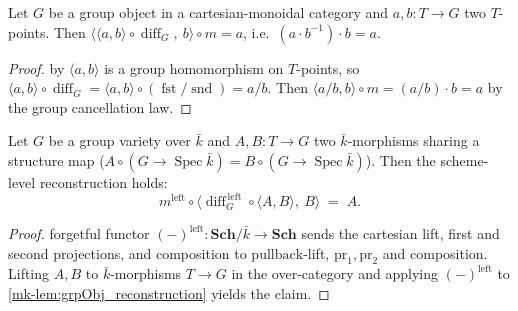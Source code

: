 \begin{lemma}\label{mk-lem:grpObj_reconstruction}
  \leanok

  Let \(G\) be a group object in a cartesian-monoidal category and \(a, b \colon T \to G\)
  two \(T\)-points. Then
  \(\bigl\langle \langle a, b\rangle \circ \operatorname{diff}_G,\ b \bigr\rangle \circ m
  = a\), i.e.\ \((a \cdot b^{-1}) \cdot b = a\).
\end{lemma}
\begin{proof}
  \leanokPrecomposition by \(\langle a, b\rangle\) is a group homomorphism on \(T\)-points, so
  \(\langle a, b\rangle \circ \operatorname{diff}_G = \langle a, b\rangle \circ
  (\operatorname{fst} / \operatorname{snd}) = a / b\). Then \(\langle a/b, b\rangle \circ m
  = (a/b) \cdot b = a\) by the group cancellation law.
\end{proof}

\begin{lemma}\label{mk-lem:scheme_reconstruction}
  \leanok

  Let \(G\) be a group variety over \(\bar k\) and \(A, B \colon T \to G\) two
  \(\bar k\)-morphisms sharing a structure map (\(A \circ (G \to \operatorname{Spec}\bar k)
  = B \circ (G \to \operatorname{Spec}\bar k)\)). Then the scheme-level reconstruction holds:
  \[
    m^{\mathrm{left}} \circ \bigl\langle
      \operatorname{diff}_G^{\,\mathrm{left}} \circ \langle A, B\rangle,\ B
    \bigr\rangle \;=\; A .
  \]
\end{lemma}
\begin{proof}
  \leanokThe forgetful functor \((-)^{\mathrm{left}} \colon \mathbf{Sch}/\bar k \to \mathbf{Sch}\)
  sends the cartesian lift, first and second projections, and composition to
  \(\mathrm{pullback}\)-lift, \(\mathrm{pr}_1, \mathrm{pr}_2\) and composition. Lifting \(A,
  B\) to \(\bar k\)-morphisms \(T \to G\) in the over-category and applying
  \((-)^{\mathrm{left}}\) to \ref{mk-lem:grpObj_reconstruction} yields the claim.
\end{proof}


